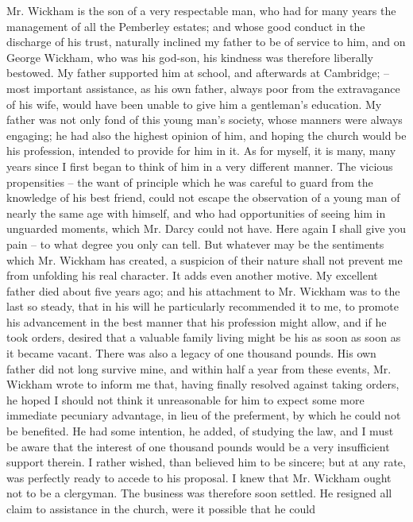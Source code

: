 \begin{letter}
Mr. Wickham is the son of a very respectable man, who
had for many years the management of all the Pemberley
estates; and whose good conduct in the discharge of his
trust, naturally inclined my father to be of service to
him, and on George Wickham, who was his god-son, his
kindness was therefore liberally bestowed. My father
supported him at school, and afterwards at Cambridge; -- most
important assistance, as his own father, always poor
from the extravagance of his wife, would have been
unable to give him a gentleman’s education. My father
was not only fond of this young man’s society, whose
manners were always engaging; he had also the highest
opinion of him, and hoping the church would be his
profession, intended to provide for him in it. As for
myself, it is many, many years since I first began to think
of him in a very different manner. The vicious
propensities -- the want of principle which he was careful to
guard from the knowledge of his best friend, could not
escape the observation of a young man of nearly the same
age with himself, and who had opportunities of seeing
him in unguarded moments, which Mr. Darcy could not
have. Here again I shall give you pain -- to what degree
you only can tell. But whatever may be the sentiments
which Mr. Wickham has created, a suspicion of their
nature shall not prevent me from unfolding his real
character. It adds even another motive. My excellent
father died about five years ago; and his attachment to
Mr. Wickham was to the last so steady, that in his will
he particularly recommended it to me, to promote his
advancement in the best manner that his profession might
allow, and if he took orders, desired that a valuable family
living might be his as soon as soon as it became vacant. There
was also a legacy of one thousand pounds. His own father
did not long survive mine, and within half a year from
these events, Mr. Wickham wrote to inform me that,
having finally resolved against taking orders, he hoped
I should not think it unreasonable for him to expect
some more immediate pecuniary advantage, in lieu of the
preferment, by which he could not be benefited. He had
some intention, he added, of studying the law, and I must
be aware that the interest of one thousand pounds would
be a very insufficient support therein. I rather wished,
than believed him to be sincere; but at any rate, was
perfectly ready to accede to his proposal. I knew that
Mr. Wickham ought not to be a clergyman. The business
was therefore soon settled. He resigned all claim to
assistance in the church, were it possible that he could

\end{letter}

